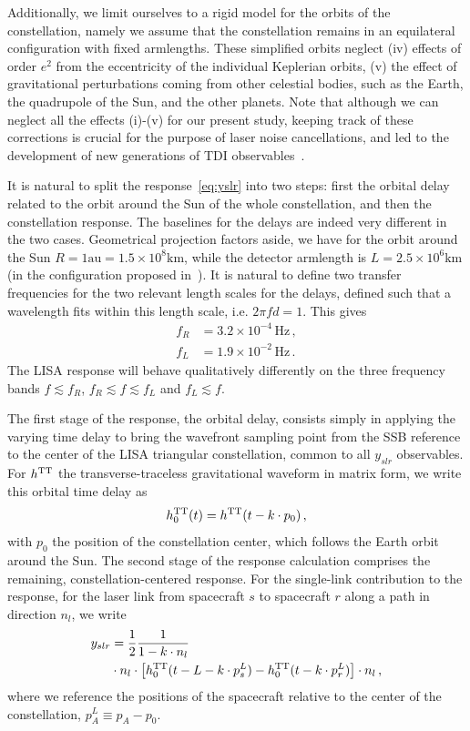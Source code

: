 \documentclass[aps,showpacs,twocolumn,
prd,superscriptaddress,nofootinbib]{revtex4-1}
\newcommand{\be}{\begin{equation}}
\newcommand{\ee}{\end{equation}}
\newcommand{\nn}{\nonumber}
\newcommand{\hatk}{k}
\newcommand{\Hz}{\,\mathrm{Hz}}
\begin{document}
Additionally, we limit ourselves to a rigid model for the orbits of the constellation, namely we assume that the constellation remains in an equilateral configuration with fixed armlengths. These simplified orbits neglect (iv) effects of order $e^{2}$ from the eccentricity of the individual Keplerian orbits, (v) the effect of gravitational perturbations coming from other celestial bodies, such as the Earth, the quadrupole of the Sun, and the other planets. Note that although we can neglect all the effects (i)-(v) for our present study, keeping track of these corrections is crucial for the purpose of laser noise cancellations, and led to the development of new generations of TDI observables~\cite{Tintoliving}.

It is natural to split the response~\eqref{eq:yslr} into two steps: first the orbital delay related to the orbit around the Sun of the whole constellation, and then the constellation response. The baselines for the delays are indeed very different in the two cases. Geometrical projection factors aside, we have for the orbit around the Sun $R=1\text{au}=1.5\times 10^{8} \text{km}$, while the detector armlength is $L=2.5\times 10^{6}\text{km}$ (in the configuration proposed in~\cite{LISA17}). It is natural to define two transfer frequencies for the two relevant length scales for the delays, defined such that a wavelength fits within this length scale, i.e. $2\pi f d = 1$. This gives
\begin{subequations}\label{eq:transferfrequencies}
\begin{align}
	f_{R} &= 3.2\times10^{-4}\Hz \,,\\
	f_{L} &= 1.9\times 10^{-2}\Hz \,.
\end{align}
\end{subequations}
The LISA response will behave qualitatively differently on the three frequency bands $f \lesssim f_{R}$, $f_{R} \lesssim f \lesssim f_{L}$ and $f_{L} \lesssim f$.

The first stage of the response, the orbital delay, consists simply in applying the varying time delay to bring the wavefront sampling point from the SSB reference to the center of the LISA triangular constellation, common to all $y_{slr}$ observables. For $h^{\rm TT}$ the transverse-traceless gravitational waveform in matrix form, we write this orbital time delay as
\be\label{eq:defresponse0}
	h_{0}^{\rm TT} (t) = h^{\rm TT}(t-\hatk\cdot p_{0}) \,,
\ee
with $p_{0}$ the position of the constellation center, which follows the Earth orbit around the Sun. The second stage of the response calculation comprises the remaining, constellation-centered response. For the single-link contribution to the response, for the laser link from spacecraft $s$ to spacecraft $r$ along a path in direction $n_l$, we write
\begin{align}\label{eq:defresponseL}
	y_{slr} &= \frac{1}{2} \frac{1}{1 - \hatk\cdot n_{l}} \nn\\
	& \cdot n_{l}\cdot \left[ h_{0}^{\rm TT}(t - L - \hatk\cdot p^{L}_{s}) - h_{0}^{\rm TT}(t - \hatk\cdot p^{L}_{r}) \right] \cdot n_{l}\,,
\end{align}
where we reference the positions of the spacecraft relative to the center of the constellation, $p^{L}_{A} \equiv p_{A} - p_{0}$.
\end{document}
